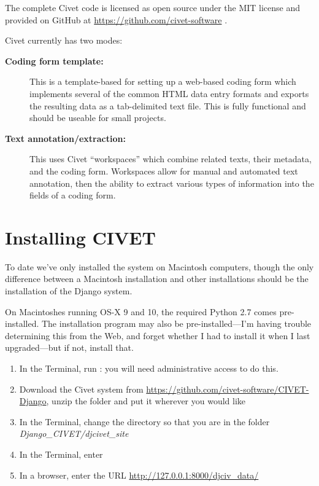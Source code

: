 \documentclass[letterpaper,10pt,english]{sphinxmanual}
\begin{document}
The complete Civet code is licensed as open source under the MIT
license and provided on GitHub at \href{https://github.com/civet-software}{https://github.com/civet-software} .

Civet currently has two modes:
\begin{description}
\item[{\textbf{Coding form template:}}] \leavevmode
This is a template-based for setting up a web-based coding form
which implements several of the common HTML data entry formats and
exports the resulting data as a tab-delimited text file. This is
fully functional and should be useable for small projects.

\item[{\textbf{Text annotation/extraction:}}] \leavevmode
This uses Civet “workspaces” which combine related texts, their
metadata, and the coding form. Workspaces allow for manual and
automated text annotation, then the ability to extract various types
of information into the fields of a coding form.

\end{description}


\chapter{Installing CIVET}
\label{installing:installing-civet}\label{installing::doc}
To date we’ve only installed the system on Macintosh computers, though
the only difference between a Macintosh installation and other
installations should be the installation of the Django system.

On Macintoshes running OS-X 9 and 10, the required Python 2.7 comes
pre-installed. The  installation program may also be
pre-installed—I’m having trouble determining this from the Web, and
forget whether I had to install it when I last upgraded—but if not,
install that.
\begin{enumerate}
\item {} 
In the Terminal, run : you will need
administrative access to do this.

\item {} 
Download the Civet system from
\href{https://github.com/civet-software/CIVET-Django}{https://github.com/civet-software/CIVET-Django}, unzip the folder and
put it wherever you would like

\item {} 
In the Terminal, change the directory so that you are in the folder
\emph{Django\_CIVET/djcivet\_site}

\item {} 
In the Terminal, enter 

\item {} 
In a browser, enter the URL \href{http://127.0.0.1:8000/djciv\_data/}{http://127.0.0.1:8000/djciv\_data/}

\end{enumerate}
\end{document}
